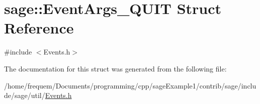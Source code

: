 \hypertarget{structsage_1_1EventArgs__QUIT}{}\section{sage\+::Event\+Args\+\_\+\+Q\+U\+IT Struct Reference}
\label{structsage_1_1EventArgs__QUIT}


{\ttfamily \#include $<$Events.\+h$>$}



The documentation for this struct was generated from the following file\+:\begin{DoxyCompactItemize}
\item 
/home/frequem/\+Documents/programming/cpp/sage\+Example1/contrib/sage/include/sage/util/\mbox{\hyperlink{Events_8h}{Events.\+h}}\end{DoxyCompactItemize}

